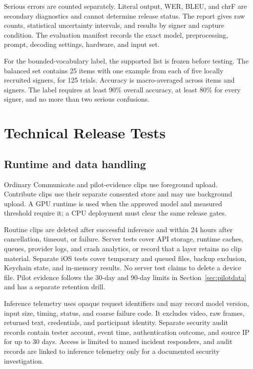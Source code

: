 \documentclass[11pt]{article}
\begin{document}
Serious errors are counted separately. Literal output, WER, BLEU, and chrF are
secondary diagnostics and cannot determine release status. The report gives raw
counts, statistical uncertainty intervals, and results by signer and capture
condition. The evaluation manifest records the exact model, preprocessing, prompt,
decoding settings, hardware, and input set.

For the bounded-vocabulary label, the supported list is frozen before testing. The
balanced set contains 25 items with one example from each of five locally recruited
signers, for 125 trials. Accuracy is macro-averaged across items and signers. The label
requires at least 90\% overall accuracy, at least 80\% for every signer, and no more
than two serious confusions.

\section{Technical Release Tests}
\label{app:technical}

\subsection{Runtime and data handling}

Ordinary Communicate and pilot-evidence clips use foreground upload. Contribute clips
use their separate consented store and may use background upload. A GPU runtime is used
when the approved model and measured threshold require it; a CPU deployment must clear
the same release gates.

Routine clips are deleted after successful inference and within 24 hours after
cancellation, timeout, or failure. Server tests cover API storage, runtime caches,
queues, provider logs, and crash analytics, or record that a layer retains no clip
material. Separate iOS tests cover temporary and queued files, backup exclusion,
Keychain state, and in-memory results. No server test claims to delete a device file.
Pilot evidence follows the 30-day and 90-day limits in
Section~\ref{sec:pilotdata} and has a separate retention drill.

Inference telemetry uses opaque request identifiers and may record model version,
input size, timing, status, and coarse failure code. It excludes video, raw frames,
returned text, credentials, and participant identity. Separate security audit records
contain tester account, event time, authentication outcome, and source IP for up to 30
days. Access is limited to named incident responders, and audit records are linked to
inference telemetry only for a documented security investigation.
\end{document}
